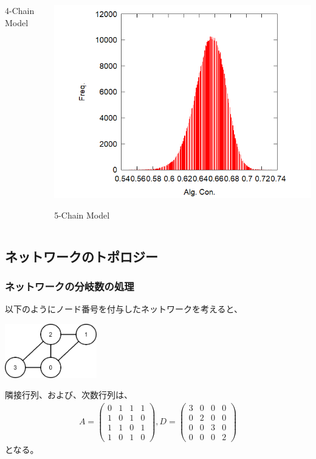 \documentclass[12pt, dvipdfmx]{beamer}
\begin{document}
\begin{frame}
\begin{columns}[totalwidth=1\textwidth]
\begin{center}
					4-Chain Model
				\end{center}
				\begin{center}
					\includegraphics[width=1.2\columnwidth]{5.png}

					5-Chain Model
				\end{center}
		\end{columns}
\end{frame}


\subsection{ネットワークのトポロジー}
\begin{frame}
	\frametitle{ネットワークの分岐数の処理}
		以下のようにノード番号を付与したネットワークを考えると、
			\begin{center}
				\includegraphics[width=4cm]{NW-4.png}
			\end{center}
		隣接行列、および、次数行列は、
		\begin{align*}
			A = \left( 
			\begin{array}{cccc} 
			0 & 1 & 1 & 1 \\ 
			1 & 0 & 1 & 0 \\
			1 & 1 & 0 & 1 \\
			1 & 0 & 1 & 0 
			\end{array} 
			\right) 
			,
			D = \left( 
			\begin{array}{cccc} 
			3 & 0 & 0 & 0 \\ 
			0 & 2 & 0 & 0 \\
			0 & 0 & 3 & 0 \\
			0 & 0 & 0 & 2 
			\end{array} 
			\right) 
		\end{align*}
		となる。
\end{frame}
\end{document}
